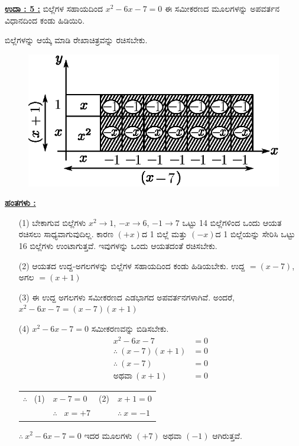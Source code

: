 \noindent
{\textbf{\underline{ಉದಾ : 5 :}}} ಬಿಲ್ಲೆಗಳ ಸಹಾಯದಿಂದ $x^2 - 6x - 7 = 0$ ಈ ಸಮೀಕರಣದ ಮೂಲ\-ಗಳನ್ನು ಅಪವರ್ತನ ವಿಧಾನದಿಂದ ಕಂಡು ಹಿಡಿಯಿರಿ. 

ಬಿಲ್ಲೆಗಳನ್ನು ಆಯ್ಕೆ ಮಾಡಿ ರೇಖಾಚಿತ್ರವನ್ನು ರಚಿಸಬೇಕು.
\begin{figure}[H]
\centering
\includegraphics[scale=0.8]{src/figure/chap3/fig3-55b.eps}
\end{figure}

\noindent
{\textbf{\underline{ಹಂತಗಳು :}}}
\begin{itemize}
\item [(1)] ಬೇಕಾಗುವ ಬಿಲ್ಲೆಗಳು $x^2 \rightarrow 1$, $-x \rightarrow 6$, $-1 \rightarrow 7$ ಒಟ್ಟು 14 ಬಿಲ್ಲೆಗಳಿಂದ ಒಂದು ಆಯತ ರಚಿಸಲು ಸಾಧ್ಯವಾಗುವುದಿಲ್ಲ. ಕಾರಣ $(+x)$ದ 1 ಬಿಲ್ಲೆ ಮತ್ತು $(-x)$ದ 1 ಬಿಲ್ಲೆಯನ್ನು ಸೇರಿಸಿ ಒಟ್ಟು 16 ಬಿಲ್ಲೆಗಳು ಉಂಟಾಗುತ್ತವೆ. ಇವುಗಳನ್ನು ಒಂದು ಆಯತದಂತೆ ರಚಿಸಬೇಕು. 
\item [(2)] ಆಯತದ ಉದ್ದ-ಅಗಲಗಳನ್ನು ಬಿಲ್ಲೆಗಳ ಸಹಾಯದಿಂದ ಕಂಡು ಹಿಡಿಯಬೇಕು. ಉದ್ದ $= (x-7)$, ಅಗಲ $= (x+1)$

\smallskip

\item [(3)] ಈ ಉದ್ದ ಅಗಲಗಳು ಸಮೀಕರಣದ ಎಡಭಾಗದ ಅಪವರ್ತನಗಳಾಗಿವೆ. ಅಂದರೆ, $x^2 - 6x - 7 = (x-7)(x+1)$
 
 \smallskip
 \item [(4)] $x^2 - 6x - 7 = 0$ ಸಮೀಕರಣವನ್ನು ಬಿಡಿಸಬೇಕು.
\begin{align*}
x^2 - 6x - 7 & = 0\\
\therefore~ (x-7)(x+1) & = 0\\
\therefore~ (x-7) & = 0\tag{1}\\
\text{ಅಥವಾ}~ (x+1) & = 0\tag{2}
\end{align*}

\begin{tabular}{llll}
$\therefore$~ (1) & $x - 7 = 0$ & (2) & $x + 1 = 0$\\
& $\therefore$~ $x = +7$ & &$\therefore~ x = -1$
\end{tabular}

\smallskip
$\therefore~ x^2 - 6x -7 = 0$ ಇದರ ಮೂಲಗಳು $(+7)$ ಅಥವಾ $(-1)$ ಆಗಿರುತ್ತವೆ. 
\end{itemize}


